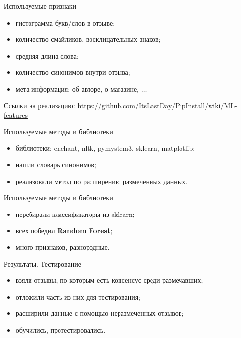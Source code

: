\documentclass[mathserif,utf8,14pt]{beamer}
\begin{document}
\begin{frame}{Используемые признаки}
     \addtocounter{framenumber}{-1}
    \begin{itemize}
        \item гистограмма букв/слов в отзыве;
        \item количество смайликов, восклицательных знаков;
        \item средняя длина слова;
        \item количество синонимов внутри отзыва;
        \item мета-информация: об авторе, о магазине, $\ldots$
    \end{itemize}
    Ссылки на реализацию: \url{https://github.com/ItsLastDay/PipInstall/wiki/ML-features}
\end{frame}

\begin{frame}{Используемые методы и библиотеки}
    \begin{itemize}
        \item библиотеки: enchant, nltk, pymystem3, sklearn, matplotlib;
        \item нашли словарь синонимов;
        \item реализовали метод по расширению размеченных данных.
    \end{itemize}
\end{frame}

\begin{frame}{Используемые методы и библиотеки}
     \addtocounter{framenumber}{-1}
    \begin{itemize}
        \item перебирали классификаторы из sklearn;
        \item всех победил \textbf{Random Forest};
        \item много признаков, разнородные.
    \end{itemize}
\end{frame}

\begin{frame}{Результаты. Тестирование}
    \begin{itemize}
        \item взяли отзывы, по которым есть консенсус среди размечавших;
        \item отложили часть из них для тестирования;
        \item расширили данные с помощью неразмеченных отзывов;
        \item обучились, протестировались.
    \end{itemize}
\end{frame}
\end{document}
